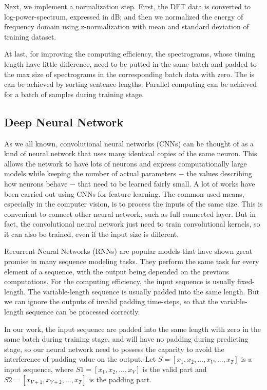 \documentclass[a4paper]{article}
\begin{document}
Next, we implement a normalization step. First, the DFT data is converted to log-power-spectrum, expressed in dB; and then we normalized the energy of frequency domain using z-normalization with mean and standard deviation of training dataset.

At last, for improving the computing efficiency, the spectrograms, whose timing length have little difference, need to be putted in the same batch and padded to the max size of spectrograms in the corresponding batch data with zero. The is can be achieved by sorting sentence lengths. Parallel computing can be achieved for a batch of samples during training stage.

\subsection{Deep Neural Network}
\label{ssec:deep_neural_network}

As we all known, convolutional neural networks (CNNs) can be thought of as a kind of neural network that uses many identical copies of the same neuron. This allows the network to have lots of neurons and express computationally large models while keeping the number of actual parameters $-$ the values describing how neurons behave $-$ that need to be learned fairly small. A lot of works have been carried out using CNNs for feature learning. The common used means, especially in the computer vision, is to process the inputs of the same size. This is convenient to connect other neural network, such as full connected layer. But in fact, the convolutional neural network just need to train convolutional kernels, so it can also be trained, even if the input size is different.

Recurrent Neural Networks (RNNs) are popular models that have shown great promise in many sequence modeling tasks. They perform the same task for every element of a sequence, with the output being depended on the previous computations. For the computing efficiency, the input sequence is usually fixed-length. The variable-length sequence is usually padded into the same length. But we can ignore the outputs of invalid padding time-steps, so that the variable-length sequence can be processed correctly.

In our work, the input sequence are padded into the same length with zero in the same batch during training stage, and will have no padding during predicting stage, so our neural network need to possess the capacity to avoid the interference of padding value on the output.  Let $S=[x_1, x_2, ..., x_V, ..., x_T]$ is a input sequence, where $S1=[x_1, x_2, ..., x_V]$ is the valid part and $S2=[x_{V+1}, x_{V+2}, ..., x_T]$ is the padding part.
\end{document}
